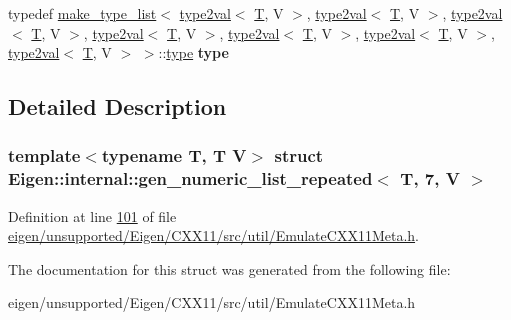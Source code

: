 \begin{DoxyCompactItemize}
typedef \hyperlink{struct_eigen_1_1internal_1_1make__type__list}{make\+\_\+type\+\_\+list}$<$ \hyperlink{struct_eigen_1_1internal_1_1type2val}{type2val}$<$ \hyperlink{group___sparse_core___module}{T}, V $>$, \hyperlink{struct_eigen_1_1internal_1_1type2val}{type2val}$<$ \hyperlink{group___sparse_core___module}{T}, V $>$, \hyperlink{struct_eigen_1_1internal_1_1type2val}{type2val}$<$ \hyperlink{group___sparse_core___module}{T}, V $>$, \hyperlink{struct_eigen_1_1internal_1_1type2val}{type2val}$<$ \hyperlink{group___sparse_core___module}{T}, V $>$, \hyperlink{struct_eigen_1_1internal_1_1type2val}{type2val}$<$ \hyperlink{group___sparse_core___module}{T}, V $>$, \hyperlink{struct_eigen_1_1internal_1_1type2val}{type2val}$<$ \hyperlink{group___sparse_core___module}{T}, V $>$, \hyperlink{struct_eigen_1_1internal_1_1type2val}{type2val}$<$ \hyperlink{group___sparse_core___module}{T}, V $>$ $>$\+::\hyperlink{struct_eigen_1_1internal_1_1type__list}{type} {\bfseries type}
\end{DoxyCompactItemize}


\subsection{Detailed Description}
\subsubsection*{template$<$typename T, T V$>$\newline
struct Eigen\+::internal\+::gen\+\_\+numeric\+\_\+list\+\_\+repeated$<$ T, 7, V $>$}



Definition at line \hyperlink{eigen_2unsupported_2_eigen_2_c_x_x11_2src_2util_2_emulate_c_x_x11_meta_8h_source_l00101}{101} of file \hyperlink{eigen_2unsupported_2_eigen_2_c_x_x11_2src_2util_2_emulate_c_x_x11_meta_8h_source}{eigen/unsupported/\+Eigen/\+C\+X\+X11/src/util/\+Emulate\+C\+X\+X11\+Meta.\+h}.



The documentation for this struct was generated from the following file\+:\begin{DoxyCompactItemize}
\item 
eigen/unsupported/\+Eigen/\+C\+X\+X11/src/util/\+Emulate\+C\+X\+X11\+Meta.\+h\end{DoxyCompactItemize}
